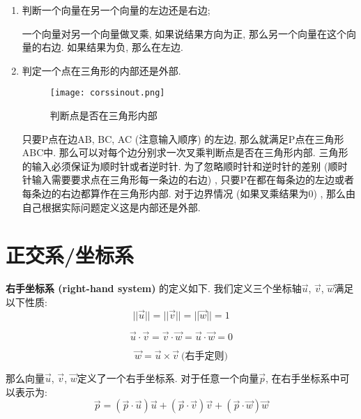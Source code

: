 \documentclass[openany]{progbookcn}
\begin{document}
\begin{enumerate}[1)]
	\item 判断一个向量在另一个向量的左边还是右边; 
	
	一个向量对另一个向量做叉乘, 如果说结果方向为正, 那么另一个向量在这个向量的右边. 如果结果为负, 那么在左边. 
	
	\item 判定一个点在三角形的内部还是外部. 
	\begin{figure}[H]
		\centering
		\texttt{[image: corssinout.png]}
		\caption{判断点是否在三角形内部}
		\label{fig:corssio}
	\end{figure}

	只要P点在边AB, BC, AC (注意输入顺序) 的左边, 那么就满足P点在三角形ABC中. 那么可以对每个边分别求一次叉乘判断点是否在三角形内部. 三角形的输入必须保证为顺时针或者逆时针. 为了忽略顺时针和逆时针的差别 (顺时针输入需要要求点在三角形每一条边的右边) , 只要P在都在每条边的左边或者每条边的右边都算作在三角形内部. 对于边界情况 (如果叉乘结果为0) , 那么由自己根据实际问题定义这是内部还是外部. 
	
\end{enumerate}

\section{正交系/坐标系}

\textbf{右手坐标系 (right-hand system) }的定义如下. 我们定义三个坐标轴$\overrightarrow{u}$, $\overrightarrow{v}$, $\overrightarrow{w}$满足以下性质: 
\begin{equation}
	||\overrightarrow{u}||=||\overrightarrow{v}||=||\overrightarrow{w}||=1
\end{equation}

\begin{equation}
	\overrightarrow{u}\cdot\overrightarrow{v}=\overrightarrow{v}\cdot\overrightarrow{w}=\overrightarrow{u}\cdot\overrightarrow{w}=0
\end{equation}

\begin{equation}
	\overrightarrow{w}=\overrightarrow{u}\times\overrightarrow{v}\ \text{(右手定则)}
\end{equation}

那么向量$\overrightarrow{u}$, $\overrightarrow{v}$, $\overrightarrow{w}$定义了一个右手坐标系. 对于任意一个向量$\overrightarrow{p}$, 在右手坐标系中可以表示为: 
\begin{equation}
	\overrightarrow{p}=(\overrightarrow{p}\cdot \overrightarrow{u})\overrightarrow{u}+(\overrightarrow{p}\cdot \overrightarrow{v})\overrightarrow{v}+(\overrightarrow{p}\cdot \overrightarrow{w})\overrightarrow{w}
\end{equation}
\end{document}
